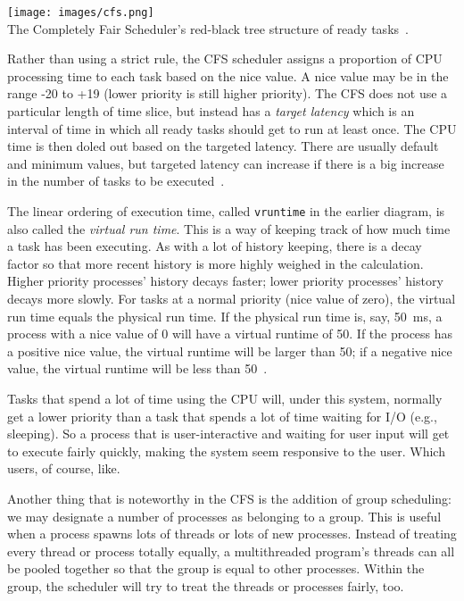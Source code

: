 \begin{center}
	\texttt{[image: images/cfs.png]}\\
	The Completely Fair Scheduler's red-black tree structure of ready tasks~\cite{osc}.
\end{center}

Rather than using a strict rule, the CFS scheduler assigns a proportion of CPU processing time to each task based on the nice value. A nice value may be in the range -20 to +19 (lower priority is still higher priority). The CFS does not use a particular length of time slice, but instead has a \textit{target latency} which is an interval of time in which all ready tasks should get to run at least once. The CPU time is then doled out based on the targeted latency. There are usually default and minimum values, but targeted latency can increase if there is a big increase in the number of tasks to be executed~\cite{osc}.

The linear ordering of execution time, called \texttt{vruntime} in the earlier diagram, is also called the \textit{virtual run time}. This is a way of keeping track of how much time a task has been executing. As with a lot of history keeping, there is a decay factor  so that more recent history is more highly weighed in the calculation. Higher priority processes' history decays faster; lower priority processes' history decays more slowly. For tasks at a normal priority (nice value of zero), the virtual run time equals the physical run time. If the physical run time is, say, 50~ms, a process with a nice value of 0 will have a virtual runtime of 50. If the process has a positive nice value, the virtual runtime will be larger than 50; if a negative nice value, the virtual runtime will be less than 50~\cite{osc}.

Tasks that spend a lot of time using the CPU will, under this system, normally get a lower priority than a task that spends a lot of time waiting for I/O (e.g., sleeping). So a process that is user-interactive and waiting for user input will get to execute fairly quickly, making the system seem responsive to the user. Which users, of course, like.

Another thing that is noteworthy in the CFS is the addition of group scheduling: we may designate a number of processes as belonging to a group. This is useful when a process spawns lots of threads or lots of new processes. Instead of treating every thread or process totally equally, a multithreaded program's threads can all be pooled together so that the group is equal to other processes. Within the group, the scheduler will try to treat the threads or processes fairly, too.

